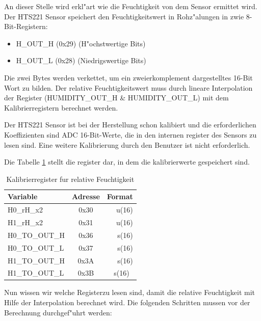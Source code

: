 An dieser Stelle wird erkl"art wie die Feuchtigkeit von dem Sensor ermittet wird. 
Der HTS221 Sensor speichert den Feuchtigkeitswert in Rohz"alungen in zwie 8-Bit-Registern:
\begin{itemize}
	\item H\_OUT\_H (0x29) (H"ochstwertige Bits)
	\item H\_OUT\_L (0x28) (Niedrigswertige Bits)
\end{itemize}
Die zwei Bytes werden verkettet, um ein zweierkomplement dargestelltes 16-Bit Wort zu bilden. Der relative Feuchtigkeitswert muss durch lineare Interpolation
der Register (HUMIDITY\_OUT\_H \& HUMIDITY\_OUT\_L) mit dem Kalibrierregistern berechnet werden.

Der HTS221 Sensor ist bei der Herstellung schon kalibiert und die erforderlichen Koeffizienten sind ADC 16-Bit-Werte, die in den internen register des Sensors zu lesen sind. Eine weitere Kalibrierung durch den Benutzer ist nicht erforderlich.

Die Tabelle \ref{tab:Reg_H} stellt die register dar, in dem die kalibrierwerte gespeichert sind. 

\begin{center}
	\begin{table}[htbp] 
		\centering 
		\Large
		\begin{tabular}{l|c|r}
			\textbf{Variable} & 	\textbf{Adresse} & \textbf{Format}\footnotemark\\
			\hline
			H0\_rH\_x2	& 0x30	& u(16) \\
			\hline
			H1\_rH\_x2	& 0x31	& u(16)\\
			\hline
			H0\_TO\_OUT\_H & 0x36	& s(16)\\
			\hline
			H0\_TO\_OUT\_L 	& 0x37  & s(16)\\
			\hline
			H1\_TO\_OUT\_H	& 0x3A	& s(16)\\
			\hline
			H1\_TO\_OUT\_L 	& 0x3B  & s(16)\
		\end{tabular} 
		\caption{Kalibrierregister fur relative Feuchtigkeit} 
		\label{tab:Reg_H} 
		 
	\end{table}
\end{center}

Nun wissen wir welche Registerzu lesen sind, damit die relative Feuchtigkeit mit Hilfe der Interpolation berechnet wird. Die folgenden Schritten mussen vor der Berechnung durchgef"uhrt werden:


